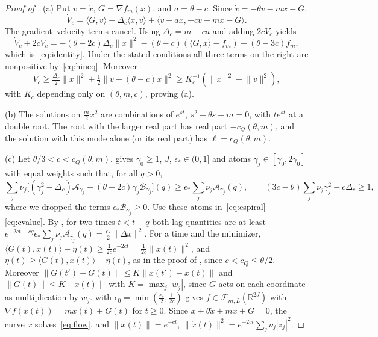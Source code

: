 \documentclass[11pt]{article}
\theoremstyle{definition}
\theoremstyle{remark}
\newcommand{\R}{\mathbb R}
\newcommand{\cF}{\mathcal F}
\newcommand{\cA}{\mathcal A}
\newcommand{\cB}{\mathcal B}
\newcommand{\ip}[2]{\langle #1,#2\rangle}
\newcommand{\norm}[1]{\lVert #1\rVert}
\newcommand{\cQ}{c_{Q}}
\begin{document}
\begin{proof}[Proof of ]
(a) Put \(v=\dot x\), \(G=\nabla f_m(x)\), and
\(a=\theta-c\).  Since \(\dot v=-\theta v-mx-G\),
\[
\dot V_c=\ip Gv+\Delta_c\ip xv+\ip{v+ax}{-cv-mx-G}.
\]
The gradient--velocity terms cancel.  Using
\(\Delta_c=m-ca\) and adding \(2cV_c\) yields
\[
\dot V_c+2cV_c
=-(\theta-2c)\Delta_c\norm x^2
-(\theta-c)(\ip Gx-f_m)-(\theta-3c)f_m,
\]
which is~\eqref{eq:identity}.  Under the stated conditions all three
terms on the right are nonpositive by~\eqref{eq:hineq}.  Moreover
\[
V_c\ge\tfrac{\Delta_c}{2}\norm x^2
+\tfrac12\norm{v+(\theta-c)x}^2
\ge K_c^{-1}(\norm x^2+\norm v^2),
\]
with \(K_c\) depending only on \((\theta,m,c)\), proving (a).

(b) The solutions on \(\frac m2x^2\) are combinations of \(e^{st}\), \(s^2+\theta s+m=0\), with \(te^{st}\) at a
double root.  The root with the larger real part has real part \(-\cQ(\theta,m)\), and the
solution with this mode alone (or its real part) has \(\ell=\cQ(\theta,m)\).

(c) Let \(\theta/3<c<\cQ(\theta,m)\).   gives \(\gamma_0\ge1\), \(J\), \(\epsilon_*\in(0,1]\) and atoms
\(\gamma_j\in[\gamma_0,2\gamma_0]\) with equal weights such that, for all \(q>0\),
\[
\textstyle\sum_j\nu_j\bigl[(\gamma_j^2-\Delta_c)\cA_{\gamma_j}\mp(\theta-2c)\gamma_j\cB_{\gamma_j}\bigr](q)\ge\epsilon_*\sum_j\nu_j\cA_{\gamma_j}(q),\qquad
(3c-\theta)\textstyle\sum_j\nu_j\gamma_j^2-c\Delta_c\ge1 ,
\]
where we dropped the terms \(\epsilon_*\cB_{\gamma_j}\ge0\).  Use these atoms in~\eqref{eq:cspiral}--\eqref{eq:cvalue}.  By
, for two times \(t<t+q\) both lag quantities are at least
\(e^{-2ct-cq}\epsilon_*\sum_j\nu_j\cA_{\gamma_j}(q)=\frac{\epsilon_*}2\norm{\Delta x}^2\).  For a time and the minimizer,
\(\ip{G(t)}{x(t)}-\eta(t)\ge\frac1{2c}e^{-2ct}=\frac1{2c}\norm{x(t)}^2\), and \(\eta(t)\ge\ip{G(t)}{x(t)}-\eta(t)\), as in
the proof of , since \(c<\cQ\le\theta/2\).  Moreover
\(\norm{G(t')-G(t)}\le K\norm{x(t')-x(t)}\) and \(\norm{G(t)}\le K\norm{x(t)}\) with \(K=\max_j|w_j|\), since \(G\)
acts on each coordinate as multiplication by \(w_j\).   with
\(\epsilon_0=\min(\frac{\epsilon_*}2,\frac1{2c})\) gives \(f\in\cF_{m,L}(\R^{2J})\) with \(\nabla f(x(t))=mx(t)+G(t)\) for
\(t\ge0\).  Since \(\ddot x+\theta\dot x+mx+G=0\), the curve \(x\) solves~\eqref{eq:flow}, and
\(\norm{x(t)}=e^{-ct}\), \(\norm{\dot x(t)}^2=e^{-2ct}\sum_j\nu_j|z_j|^2\).


\end{proof}
\end{document}
